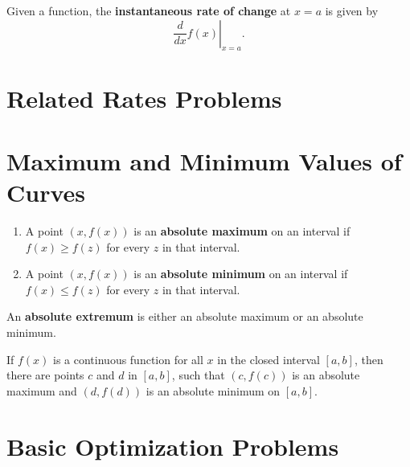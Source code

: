 \documentclass{ximera}
\newcommand{\ddx}{\frac{d}{dx}}
\begin{document}
\begin{definition}
Given a function, the \textbf{instantaneous rate of change} at $x=a$ is given by
\[
\left.\ddx f(x) \right|_{x=a}.
\]
\end{definition}





\section*{Related Rates Problems}








\section*{Maximum and Minimum Values of Curves}







\begin{definition}\hfil{}
\begin{enumerate}
\item A point $(x,f(x))$ is an \textbf{absolute maximum} on an interval
if $f(x)\ge f(z)$ for every $z$ in that interval.
\item A point $(x,f(x))$ is an \textbf{absolute minimum} on an interval if
$f(x)\le f(z)$ for every $z$ in that interval.
\end{enumerate}
An \textbf{absolute extremum} is either an
absolute maximum or an absolute minimum.
\end{definition}



\begin{theorem}\label{theorem:evt}
If $f(x)$ is a continuous function for all $x$ in the closed interval
$[a,b]$, then there are points $c$ and $d$ in $[a,b]$, such that
$(c,f(c))$ is an absolute maximum and $(d,f(d))$ is an absolute
minimum on $[a, b]$.
\end{theorem}






\section*{Basic Optimization Problems}
\end{document}
